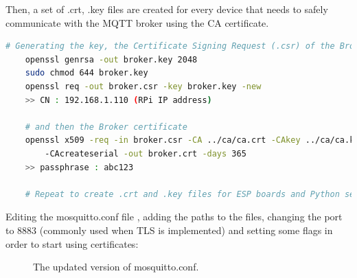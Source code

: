 \documentclass[target=bach,aauheader=,style=]{thud}
\begin{document}
Then, a set of .crt, .key files are created for every device that needs to safely communicate with the MQTT broker using the CA certificate.

\begin{lstlisting}[language=bash,style=bash]
	# Generating the key, the Certificate Signing Request (.csr) of the Broker
	openssl genrsa -out broker.key 2048
	sudo chmod 644 broker.key
	openssl req -out broker.csr -key broker.key -new
	>> CN : 192.168.1.110 (RPi IP address)
	
	# and then the Broker certificate
	openssl x509 -req -in broker.csr -CA ../ca/ca.crt -CAkey ../ca/ca.key 
		-CAcreateserial -out broker.crt -days 365
	>> passphrase : abc123
	
	# Repeat to create .crt and .key files for ESP boards and Python server
\end{lstlisting}

Editing the mosquitto.conf file \cite{mosquittoconfig}, adding the paths to the files, changing the port to 8883 (commonly used when TLS is implemented) and setting some flags in order to start using certificates:

\begin{figure}[h!]
	\centering
	\caption{The updated version of mosquitto.conf.}
	\label{fig:conf2}
\end{figure}
\newpage
\end{document}
